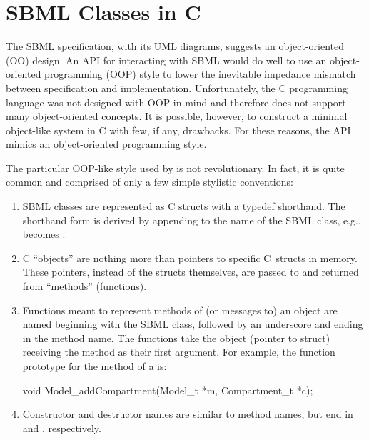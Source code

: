 \documentclass{sbmlmanual}
\begin{document}
\section{SBML Classes in C}
\label{sec:sbml-classes-in-c}

The SBML specification, with its UML diagrams, suggests an object-oriented
(OO) design.  An API for interacting with SBML would do well to use an
object-oriented programming (OOP) style to lower the inevitable impedance
mismatch between specification and implementation.  Unfortunately, the C
programming language was not designed with OOP in mind and therefore does
not support many object-oriented concepts.  It is possible, however, to
construct a minimal object-like system in C with few, if any, drawbacks.
For these reasons, the \libsbml{} API mimics an object-oriented programming
style.

The particular OOP-like style used by \libsbml{} is not
revolutionary.  In fact, it is quite common and comprised of only a
few simple stylistic conventions:

\begin{enumerate}

  \item SBML classes are represented as C structs with a typedef
  shorthand.  The shorthand form is derived by appending 
  to the name of the SBML class, e.g.,  becomes
  .

  \item C ``objects'' are nothing more than pointers to specific
  C~structs in memory.  These pointers, instead of the structs
  themselves, are passed to and returned from ``methods'' (functions).

  \item Functions meant to represent methods of (or messages to) an
  object are named beginning with the SBML class, followed by an
  underscore and ending in the method name.  The functions take the
  object (pointer to struct) receiving the method as their first
  argument.  For example, the function prototype for the
   method of a  is:

    \begin{cVerbatim}
    void Model_addCompartment(Model_t *m, Compartment_t *c);
    \end{cVerbatim}

  \item Constructor and destructor names are similar to method names,
  but end in  and , respectively.

\end{enumerate}
\end{document}
